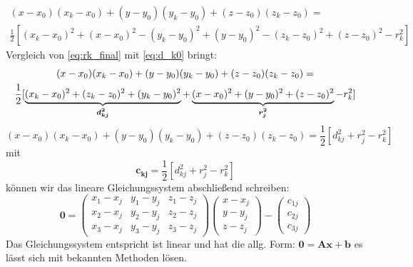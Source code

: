 %
\begin{multline}\label{eq:rk_final}
(x-x_0)(x_k-x_0)+(y-y_0)(y_k-y_0)+(z-z_0)(z_k-z_0)= \\\frac{1}{2}[(x_k-x_0)^2+(x-x_0)^2-(y_k-y_0)^2 +(y-y_0)^2-(z_k-z_0)^2 +(z-z_0)^2-r_k^2]
\end{multline}
%
Vergleich von \eqref{eq:rk_final} mit \eqref{eq:d_k0} bringt: 
%
\begin{multline}
(x-x_0)(x_k-x_0)+(y-y_0)(y_k-y_0)+(z-z_0)(z_k-z_0)= \\\frac{1}{2}[\underbrace{(x_k-x_0)^2+(z_k-z_0)^2+(y_k-y_0)^2}_\text{\boldmath{$d_{kj}^2$}}+\underbrace{(x-x_0)^2+(y-y_0)^2 +(z-z_0)^2}_\text{\boldmath{$r_j^2$}}-r_k^2]
\end{multline}
%
\begin{equation}
(x-x_0)(x_k-x_0)+(y-y_0)(y_k-y_0)+(z-z_0)(z_k-z_0)=\frac{1}{2}[d_{kj}^2+r_{j}^2-r_k^2]\label{eq:rk_final_simplyfied}
\end{equation}
mit 
\begin{equation}\label{eq:c_kj}
\mathbf{c_{kj}}=\frac{1}{2}[d_{kj}^2+r_{j}^2-r_k^2]
\end{equation}
können wir das lineare Gleichungssystem abschließend schreiben:
%
\begin{equation}
\mathbf{0}=
\left(
	\begin{array}{ccc}
		x_1-x_j & y_1-y_j & z_1-z_j \\
		x_2-x_j & y_2-y_j & z_2-z_j \\
		x_3-x_j & y_3-y_j & z_3-z_j
	\end{array}
\right)
\left(
   \begin{array}{c}
	   x-x_j\\
	   y-y_j\\
	   z-z_j
   \end{array}
\right)
-
\left(
	\begin{array}{c}
		c_{1j}\\
		c_{2j}\\
		c_{3j}
	\end{array}
\right)
\end{equation}
%
Das Gleichungssystem entspricht ist linear und hat die allg. Form: $\mathbf{0} = \mathbf{Ax}+\mathbf{b}$ es lässt sich mit bekannten Methoden lösen.



